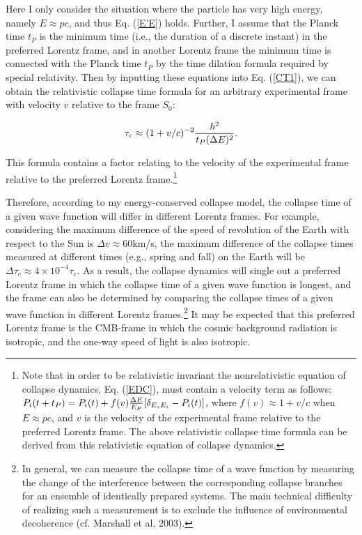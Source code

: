\noindent Here I only consider the situation where the particle has very high energy, namely $E \approx pc$, and thus Eq. (\ref{E'E}) holds. Further, I assume that the Planck time $t_P$ is the minimum time (i.e., the duration of a discrete instant) in the preferred Lorentz frame, and in another Lorentz frame the minimum time is connected with the Planck time $t_P$ by the time dilation formula required by special relativity. Then by inputting these equations into Eq. (\ref{CT1}), we can obtain the relativistic collapse time formula for an arbitrary experimental frame with velocity $v$ relative to the frame $S_0$:

\begin{equation}
\tau_c \approx (1+v/c)^{-2}{\hbar^2 \over {t_P (\Delta E)^2}}.
\label{CT2}
\end{equation}

\noindent This formula contains a factor relating to the velocity of the experimental frame relative to the preferred Lorentz frame.\footnote{Note that in order to be relativistic invariant the nonrelativistic equation of collapse dynamics, Eq. (\ref{EDC}), must contain a velocity term as follows: $P_i(t+t_P) = P_i(t) + f(v){\Delta E \over E_P} [\delta_{E_sE_i}-P_i(t)]$, where $f(v) \approx 1+v/c$ when $E \approx pc$, and $v$ is the velocity of the experimental frame relative to the preferred Lorentz frame. The above relativistic collapse time formula can be derived from this relativistic equation of collapse dynamics.}

Therefore, according to my energy-conserved collapse model, the collapse time of a given wave function will differ in different Lorentz frames. For example, considering the maximum difference of the speed of revolution  of the Earth with respect to the Sun is $\Delta v \approx 60 $km/s, the maximum difference of the collapse times measured at different times (e.g., spring and fall) on the Earth will be $\Delta \tau_c \approx 4 \times 10^{-4} \tau_c $. As a result, the collapse dynamics will single out a preferred Lorentz frame in which the collapse time of a given wave function is longest, and the frame can also be determined by comparing the collapse times of a given wave function in different Lorentz frames.\footnote{In general, we can measure the collapse time of a wave function by measuring the change of the interference between the corresponding collapse branches for an ensemble of identically prepared systems. The main technical difficulty of realizing such a measurement is to exclude the influence of environmental decoherence (cf. Marshall et al, 2003).} It may be expected that this preferred Lorentz frame is the CMB-frame in which the cosmic background radiation is isotropic, and the one-way speed of light is also isotropic.

